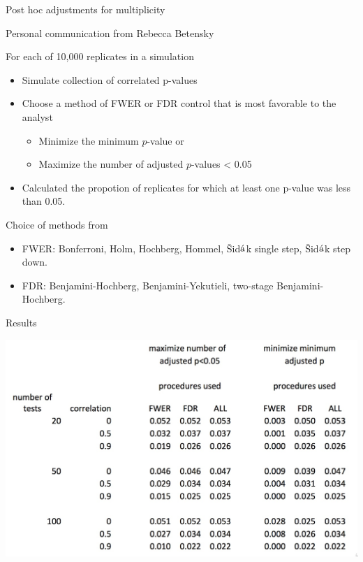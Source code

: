 \documentclass[ignorenonframetext,]{beamer}
\providecommand{\tightlist}{%
  \setlength{\itemsep}{0pt}\setlength{\parskip}{0pt}}
\begin{document}
\begin{frame}{Post hoc adjustments for multiplicity}
\protect\hypertarget{post-hoc-adjustments-for-multiplicity}{}

\small

Personal communication from Rebecca Betensky

For each of 10,000 replicates in a simulation

\begin{itemize}
\item
  Simulate collection of correlated p-values\\
\item
  Choose a method of FWER or FDR control that is most favorable to the
  analyst

  \begin{itemize}
  \tightlist
  \item
    Minimize the minimum \(p\)-value or\\
  \item
    Maximize the number of adjusted \(p\)-values \textless{} 0.05
  \end{itemize}
\item
  Calculated the propotion of replicates for which at least one p-value
  was less than 0.05.
\end{itemize}

Choice of methods from

\begin{itemize}
\item
  FWER: Bonferroni, Holm, Hochberg, Hommel,
  \v{S}id\(\acute{\textrm a}\)k single step,
  \v{S}id\(\acute{\textrm a}\)k step down.
\item
  FDR: Benjamini-Hochberg, Benjamini-Yekutieli, two-stage
  Benjamini-Hochberg.
\end{itemize}

\end{frame}

\begin{frame}{Results}
\protect\hypertarget{results}{}

\centering

\includegraphics{../figures/rb_table.jpeg}

\end{frame}
\end{document}
